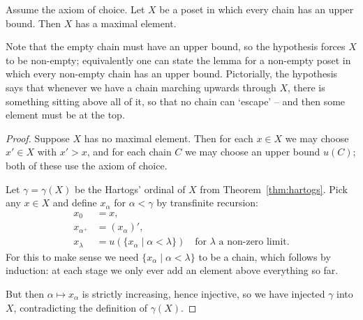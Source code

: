\documentclass[a4paper]{scrartcl}
\begin{document}
\begin{theorem}\label{thm:zorn}
Assume the axiom of choice. Let $X$ be a poset in which every chain has an upper bound. Then $X$ has a maximal element.
\end{theorem}

Note that the empty chain must have an upper bound, so the hypothesis forces $X$ to be non-empty; equivalently one can state the lemma for a non-empty poset in which every non-empty chain has an upper bound. Pictorially, the hypothesis says that whenever we have a chain marching upwards through $X$, there is something sitting above all of it, so that no chain can `escape' -- and then some element must be at the top.

\begin{center}
\end{center}

\begin{proof}
  Suppose $X$ has no maximal element. Then for each $x \in X$ we may choose $x' \in X$ with $x' > x$, and for each chain $C$ we may choose an upper bound $u(C)$; both of these use the axiom of choice.

  Let $\gamma = \gamma(X)$ be the Hartogs' ordinal of $X$ from Theorem~\ref{thm:hartogs}. Pick any $x \in X$ and define $x_\alpha$ for $\alpha < \gamma$ by transfinite recursion:
  \begin{align*}
    x_0 &= x, \\
    x_{\alpha^+} &= (x_{\alpha})', \\
    x_{\lambda} &= u(\{x_\alpha \mid \alpha < \lambda\}) \quad \text{for } \lambda \text{ a non-zero limit.}
  \end{align*}
  For this to make sense we need $\{x_\alpha \mid \alpha < \lambda\}$ to be a chain, which follows by induction: at each stage we only ever add an element above everything so far.

  But then $\alpha \mapsto x_\alpha$ is strictly increasing, hence injective, so we have injected $\gamma$ into $X$, contradicting the definition of $\gamma(X)$.
\end{proof}
\end{document}
